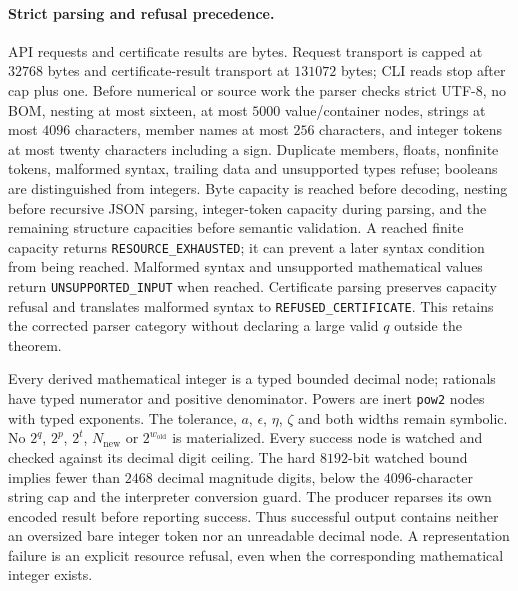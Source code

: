 \paragraph{Strict parsing and refusal precedence.}
API requests and certificate results are bytes. Request transport is capped
at $32768$ bytes and certificate-result transport at $131072$ bytes; CLI
reads stop after cap plus one. Before numerical or source work the parser
checks strict UTF-8, no BOM, nesting at most sixteen, at most $5000$
value/container nodes, strings at most $4096$ characters, member names at
most $256$ characters, and integer tokens at most twenty characters including
a sign. Duplicate members, floats, nonfinite tokens, malformed syntax,
trailing data and unsupported types refuse; booleans are distinguished from
integers. Byte capacity is reached before decoding, nesting before recursive
JSON parsing, integer-token capacity during parsing, and the remaining
structure capacities before semantic validation. A reached finite capacity
returns \texttt{RESOURCE\_EXHAUSTED}; it can prevent a later syntax condition
from being reached. Malformed syntax and unsupported mathematical values
return \texttt{UNSUPPORTED\_INPUT} when reached. Certificate parsing preserves
capacity refusal and translates malformed syntax to
\texttt{REFUSED\_CERTIFICATE}. This retains the corrected parser category
without declaring a large valid $q$ outside the theorem.

Every derived mathematical integer is a typed bounded decimal node;
rationals have typed numerator and positive denominator. Powers are inert
\texttt{pow2} nodes with typed exponents. The tolerance, $a$, $\epsilon$,
$\eta$, $\zeta$ and both widths remain symbolic. No $2^q$, $2^p$, $2^t$,
$N_{\mathrm{new}}$ or $2^{w_{\mathrm{old}}}$ is materialized. Every success
node is watched and checked against its decimal digit ceiling. The hard
$8192$-bit watched bound implies fewer than $2468$ decimal magnitude digits,
below the $4096$-character string cap and the interpreter conversion guard.
The producer reparses its own encoded result before reporting success.
Thus successful output contains neither an oversized bare integer token nor
an unreadable decimal node. A representation failure is an explicit resource
refusal, even when the corresponding mathematical integer exists.

